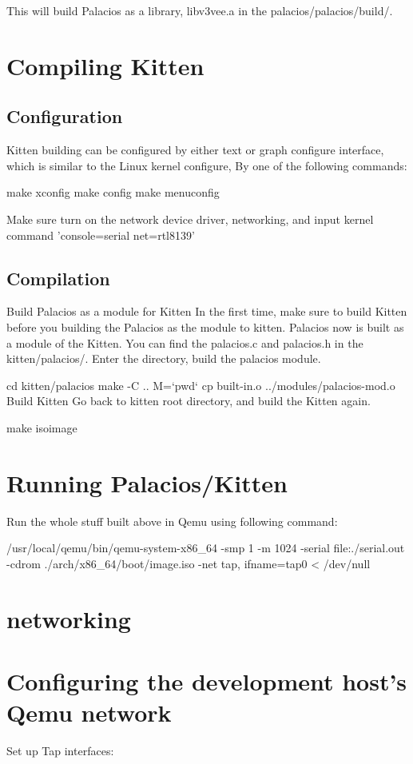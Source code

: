 \documentclass[11pt]{article}
\begin{document}
This will build Palacios as a library, libv3vee.a in the palacios/palacios/build/.


\section{Compiling Kitten}
\subsection{Configuration}
Kitten building can be configured by either text or graph configure interface, which is similar to the Linux kernel configure, By one of the following commands:

make xconfig
make config
make menuconfig

Make sure turn on the network device driver, networking, and input kernel command 'console=serial net=rtl8139'
\subsection{Compilation}

Build Palacios as a module for Kitten
In the first time, make sure to build Kitten before you building the Palacios as the module to kitten. 
Palacios now is built as a module of the Kitten. You can find the palacios.c and palacios.h in the kitten/palacios/. Enter the directory, build the palacios module.

cd kitten/palacios
make -C .. M=`pwd`
cp built-in.o ../modules/palacios-mod.o
Build Kitten
Go back to kitten root directory, and build the Kitten again.

make  isoimage

\section{Running Palacios/Kitten}
Run the whole stuff built above in Qemu using following command: 

/usr/local/qemu/bin/qemu-system-x86\_64 -smp 1 -m 1024 -serial file:./serial.out -cdrom ./arch/x86\_64/boot/image.iso  -net tap, ifname=tap0  < /dev/null


\section{networking}

\section{Configuring the development host's Qemu network}
Set up Tap interfaces:
\end{document}
